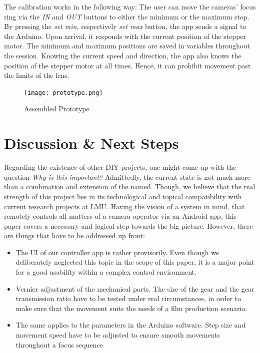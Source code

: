 \documentclass{sigchi}
\begin{document}
The calibration works in the following way: The user can move the cameras' focus ring via the \textit{IN} and \textit{OUT} buttons to either the minimum or the maximum stop. By pressing the \textit{set min}, respectively \textit{set max} button, the app sends a signal to the Arduino. Upon arrival, it responds with the current position of the stepper motor. The minimum and maximum positions are saved in variables throughout the session. Knowing the current speed and direction, the app also knows the position of the stepper motor at all times. Hence, it can prohibit movement past the limits of the lens.

\begin{figure}
  \center
  \texttt{[image: prototype.png]}
  \caption{Assembled Prototype}
  \label{fig:prototype}
\end{figure} 

\section{Discussion \& Next Steps}

Regarding the existence of other DIY projects, one might come up with the question \textit{Why is this important?} Admittedly, the current state is not much more than a combination and extension of the named. Though, we believe that the real strength of this project lies in its technological and topical compatibility with current research projects at LMU. Having the vision of a system in mind, that remotely controls all matters of a camera operator via an Android app, this paper covers a necessary and logical step towards the big picture. 
However, there are things that have to be addressed up front: 
\begin{itemize}
  \item The UI of our controller app is rather provisorily. Even though we deliberately neglected this topic in the scope of this paper, it is a major point for a good usability within a complex control environment.
  \item Vernier adjustment of the mechanical parts. The size of the gear and the gear transmission ratio have to be tested under real circumstances, in order to make sure that the movement suits the needs of a film production scenario.
  \item The same applies to the parameters in the Arduino software. Step size and movement speed have to be adjusted to ensure smooth movements throughout a focus sequence.
\end{itemize}
\end{document}
